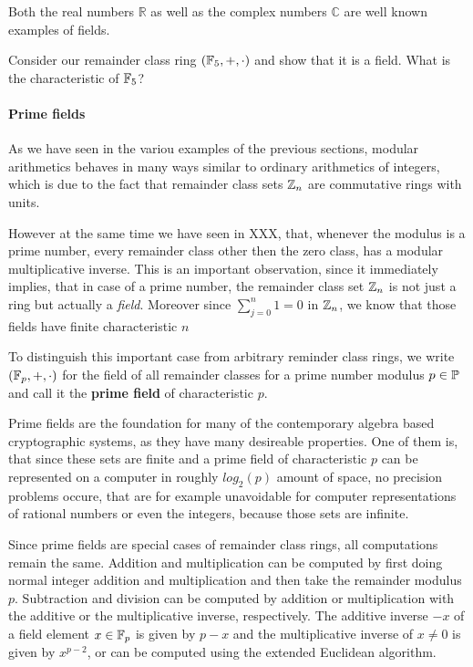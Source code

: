 \begin{example}
Both the real numbers $\mathbb{R}$ as well as the complex numbers $\mathbb{C}$ are well known examples of fields.
\end{example}
\begin{exercise}
Consider our remainder class ring $(\mathbb{F}_5,+,\cdot)$ and show that it is a field. What is the characteristic of $\mathbb{F}_5$?
\end{exercise}
\paragraph{Prime fields}
As we have seen in the variou examples of the previous sections, modular arithmetics behaves in many ways similar to ordinary arithmetics of integers, which is due to the fact that remainder class sets $\mathbb{Z}_n$ are commutative rings with units.

However at the same time we have seen in XXX, that, whenever the modulus is a prime number, every remainder class other then the zero class, has a modular multiplicative inverse. This is an important observation, since it immediately implies, that in case of a prime number, the remainder class set $\mathbb{Z}_n$ is not just a ring but actually a \textit{field}. Moreover since $\sum_{j=0}^n 1 = 0$ in $\mathbb{Z}_n$, we know that those fields have finite characteristic $n$ 

To distinguish this important case from arbitrary reminder class rings, we write  $ (\mathbb{F}_p, +, \cdot) $ for the field of all remainder classes for a prime number modulus $p \in \mathbb{P}$ and call it the \textbf{prime field} of characteristic $p$.

Prime fields are the foundation for many of the contemporary algebra based cryptographic systems, as they have many desireable properties. One of them is, that since these sets are finite and a prime field of characteristic $p$ can be represented on a computer in roughly $log_2(p)$ amount of space, no precision problems occure, that are for example unavoidable for computer representations of rational numbers or even the integers, because those sets are infinite.

Since prime fields are special cases of remainder class rings, all computations remain the same. Addition and multiplication can be computed by first doing normal integer addition and multiplication and then take the remainder modulus $p$. Subtraction and division can be computed by addition or multiplication with the additive or the multiplicative inverse, respectively. The additive inverse $-x$ of a field element $x\in\mathbb{F}_p$ is given by $p-x$ and the multiplicative inverse of $x\neq 0$ is given by $x^{p-2}$, or can be computed using the extended Euclidean algorithm. 

